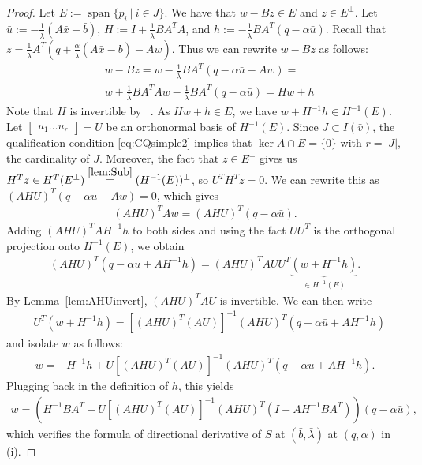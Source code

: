 \documentclass[reqno]{amsart}
\numberwithin{equation}{section}
\begin{document}
\begin{proof}
Let $E := \operatorname{span}\{p_i\ |\ i \in J\}$.
We have that $w - Bz \in E$ and $z \in E^{\bot}$. Let $\bar{u} := - \frac{1}{\bar{\lambda}}(A \bar{x} - \bar{b})$, $H := I + \frac{1}{\bar{\lambda}} BA^{T} A$, and $h := -\frac{1}{\bar{\lambda}} BA^{T}(q - \alpha \bar{u})$.
Recall that $z = \frac{1}{\bar{\lambda}} A^T(q + \frac{\alpha}{\bar{\lambda}}(A \bar{x} - \bar{b}) - Aw)$. Thus we can rewrite $w - Bz$ as follows: \begin{align*}
    &w - Bz = w - \frac{1}{\bar{\lambda}}BA^{T}(q - \alpha \bar{u} - Aw) = 
    \\ &w + \frac{1}{\bar{\lambda}} BA^{T} Aw - \frac{1}{\bar{\lambda}} BA^{T} (q - \alpha \bar{u}) = Hw + h
\end{align*}
Note that $H$ is invertible by ~.  As $Hw + h \in E$, we have  $w + H^{-1}h \in H^{-1}(E)$. Let $\begin{bmatrix}
    u_1 \hdots u_r
\end{bmatrix} = U$ be an orthonormal basis of $H^{-1}(E)$. Since $J\subset I(\bar v)$, the qualification condition \eqref{eq:CQsimple2}
implies that $\ker A \cap E = \{0\}$ with $r=|J|$, the cardinality of $J$. Moreover,  the fact that $z \in E^{\bot}$ gives us $H^Tz \in H^T(E^{\bot}) \overset{\eqref{lem:Sub}}{=} (H^{-1}(E))^{\bot}$, so $U^TH^Tz = 0$.
 We can rewrite this as $
    (AHU)^T(q - \alpha \bar{u} - Aw) = 0$,
 which gives 
 \begin{align}
     (AHU)^T Aw = (AHU)^T (q - \alpha \bar{u}).
 \end{align} Adding $(AHU)^T AH^{-1}h$ to both sides and using the fact $UU^T$ is the orthogonal projection onto $H^{-1}(E)$, we obtain
 \begin{align*}
    (AHU)^{T} (q - \alpha \bar{u} + AH^{-1}h) = (AHU)^{T} A UU^{T}\underbrace{(w + H^{-1}h)}_{\in H^{-1}(E)}.
 \end{align*}
 By Lemma~\ref{lem:AHUinvert}, $(AHU)^T AU$ is invertible. We can then write
 \begin{align*}
    & U^T(w + H^{-1}h) = [(AHU)^T (AU)]^{-1} (AHU)^{T} (q - \alpha \bar{u} + AH^{-1}h)
 \end{align*} and isolate $w$ as follows:
 \begin{align*}
    w = -H^{-1}h + U[(AHU)^T (AU)]^{-1} (AHU)^{T} (q - \alpha \bar{u} + AH^{-1}h).
 \end{align*}
 Plugging back in the definition of $h$, this yields
 \begin{align*}
    w = (H^{-1}BA^T + U[(AHU)^T (AU)]^{-1} (AHU)^{T} (I - AH^{-1}BA^T)) (q - \alpha \bar{u}),
 \end{align*} 
 which verifies the formula of directional derivative of $S$ at $(\bar b,\bar \lambda)$ at $(q,\alpha)$ in (i). 


\end{proof}
\end{document}
